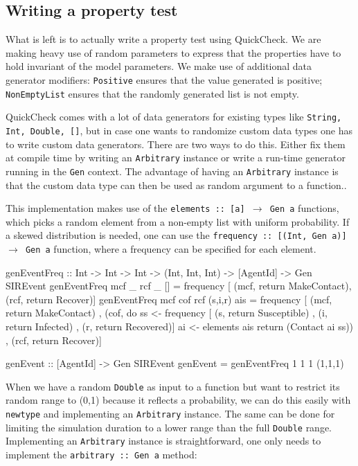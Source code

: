\subsection{Writing a property test}
What is left is to actually write a property test using QuickCheck. We are making heavy use of random parameters to express that the properties have to hold invariant of the model parameters. We make use of additional data generator modifiers: \texttt{Positive} ensures that the value generated is positive; \texttt{NonEmptyList} ensures that the randomly generated list is not empty.

QuickCheck comes with a lot of data generators for existing types like \texttt{String, Int, Double, []}, but in case one wants to randomize custom data types one has to write custom data generators. There are two ways to do this. Either fix them at compile time by writing an \texttt{Arbitrary} instance or write a run-time generator running in the \texttt{Gen} context. The advantage of having an \texttt{Arbitrary} instance is that the custom data type can then be used as random argument to a function..

This implementation makes use of the \texttt{elements :: [a] $\rightarrow$ Gen a} functions, which picks a random element from a non-empty list with uniform probability. If a skewed distribution is needed, one can use the \texttt{frequency :: [(Int, Gen a)] $\rightarrow$ Gen a} function, where a frequency can be specified for each element.

\begin{HaskellCode}
genEventFreq :: Int
             -> Int
             -> Int
             -> (Int, Int, Int)
             -> [AgentId]
             -> Gen SIREvent
genEventFreq mcf _ rcf _ []  
  = frequency [ (mcf, return MakeContact), (rcf, return Recover)]
genEventFreq mcf cof rcf (s,i,r) ais
  = frequency [ (mcf, return MakeContact)
              , (cof, do
                  ss <- frequency [ (s, return Susceptible)
                                  , (i, return Infected)
                                  , (r, return Recovered)]
                  ai <- elements ais
                  return (Contact ai ss))
              , (rcf, return Recover)]
         
genEvent :: [AgentId] -> Gen SIREvent
genEvent = genEventFreq 1 1 1 (1,1,1) 
\end{HaskellCode}

When we have a random \texttt{Double} as input to a function but want to restrict its random range to (0,1) because it reflects a probability, we can do this easily with \texttt{newtype} and implementing an \texttt{Arbitrary} instance. The same can be done for limiting the simulation duration to a lower range than the full \texttt{Double} range. Implementing an \texttt{Arbitrary} instance is straightforward, one only needs to implement the \texttt{arbitrary :: Gen a} method:

